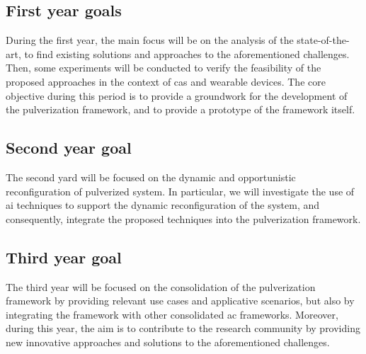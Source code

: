 \documentclass[12pt,a4paper]{article}
\begin{document}
\subsection{First year goals}\label{subsec:first-year-activities}
During the first year,
the main focus will be on the analysis of the state-of-the-art,
to find existing solutions and approaches to the aforementioned challenges.
%
Then,
some experiments will be conducted to verify the feasibility of the proposed approaches
in the context of \ac{cas} and wearable devices.
%
The core objective during this period is to provide a groundwork for the development of the pulverization framework,
and to provide a prototype of the framework itself.

\subsection{Second year goal}\label{subsec:second-year-activities}
The second yard will be focused on the dynamic and opportunistic reconfiguration of pulverized system.
%
In particular,
we will investigate the use of \ac{ai} techniques to support the dynamic reconfiguration of the system,
and consequently,
integrate the proposed techniques into the pulverization framework.

\subsection{Third year goal}\label{subsec:third-year-activities}
The third year will be focused on the consolidation of the pulverization framework by providing relevant use cases and applicative scenarios,
but also by integrating the framework with other consolidated \ac{ac} frameworks.
%
Moreover,
during this year,
the aim is to contribute to the research community by providing new innovative approaches and solutions to the aforementioned challenges.


\end{document}
